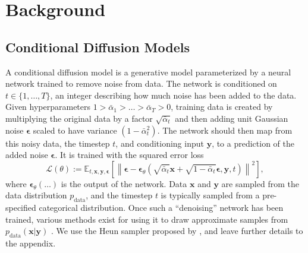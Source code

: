\chapter{Background}
\section{Conditional Diffusion Models}
A conditional diffusion model \citep{tashiro2021csdi, ddpm, sohldickstein} is a generative model parameterized by a neural network trained to remove noise from data. The network is conditioned on $t \in \{ 1, \ldots, T\}$, an integer describing how much noise has been added to the data. Given hyperparameters $1 > \bar{\alpha}_1 > \ldots > \bar{\alpha}_T > 0$, training data is created by multiplying the original data by a factor $\sqrt{\bar{\alpha}_t}$ and then adding unit Gaussian noise $\boldsymbol{\epsilon}$ scaled to have variance $(1-\bar{\alpha}_t^2)$. The network should then map from this noisy data, the timestep $t$, and conditioning input $\mathbf{y}$, to a prediction of the added noise $\boldsymbol{\epsilon}$. It is trained with the squared error loss
\begin{equation}
    \mathcal{L}(\theta):=\mathbb{E}_{t, \mathbf{x}, \mathbf{y}, \boldsymbol{\epsilon}}\left[\left\|\boldsymbol{\epsilon}-\boldsymbol{\epsilon}_\theta\left(\sqrt{\bar{\alpha}_t} \mathbf{x}+\sqrt{1-\bar{\alpha}_t} \boldsymbol{\epsilon}, \mathbf{y}, t\right)\right\|^2\right],
    \label{eq:lsimple}
\end{equation}
where $\boldsymbol{\epsilon}_\theta(\ldots)$ is the output of the network. Data $\mathbf{x}$ and $\mathbf{y}$ are sampled from the data distribution $p_\text{data}$, and the timestep $t$ is typically sampled from a pre-specified categorical distribution. Once such a ``denoising'' network has been trained, various methods exist for using it to draw approximate samples from $p_\text{data}(\mathbf{x}|\mathbf{y})$ \citep{ddpm,sohldickstein,tashiro2021csdi,song2020score,karras2022elucidating}. We use the Heun sampler proposed by \citet{karras2022elucidating}, and leave further details to the appendix.

